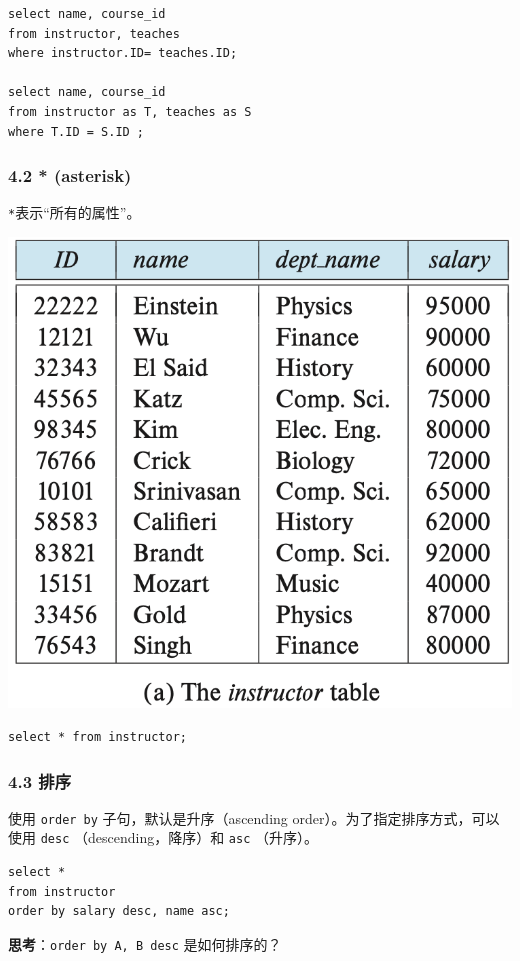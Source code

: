 \documentclass[aspectratio=169, 14pt]{beamer}
\begin{document}
\begin{frame}[fragile]

    \begin{verbatim} 
select name, course_id
from instructor, teaches
where instructor.ID= teaches.ID;   

select name, course_id
from instructor as T, teaches as S
where T.ID = S.ID ;
    \end{verbatim} 

\end{frame}

\begin{frame}[fragile]
    \frametitle{4.2 * (asterisk)}
\texttt{*}表示“所有的属性”。    

\includegraphics[width=.6\textwidth,trim={0cm 8.5cm 0cm 0cm},clip]{table/instructor}

\begin{verbatim} 
select * from instructor;
\end{verbatim} 


\end{frame}

\begin{frame}[fragile]
    \frametitle{4.3 排序}
    使用 \texttt{order by} 子句，默认是升序（ascending order）。为了指定排序方式，可以使用 \texttt{desc} （descending，降序）和 \texttt{asc} （升序）。

    \begin{verbatim} 
select *
from instructor
order by salary desc, name asc;        
    \end{verbatim}     

 \textbf{思考}：\alert{\texttt{order by A, B desc}} 是如何排序的？
\end{frame}
\end{document}
